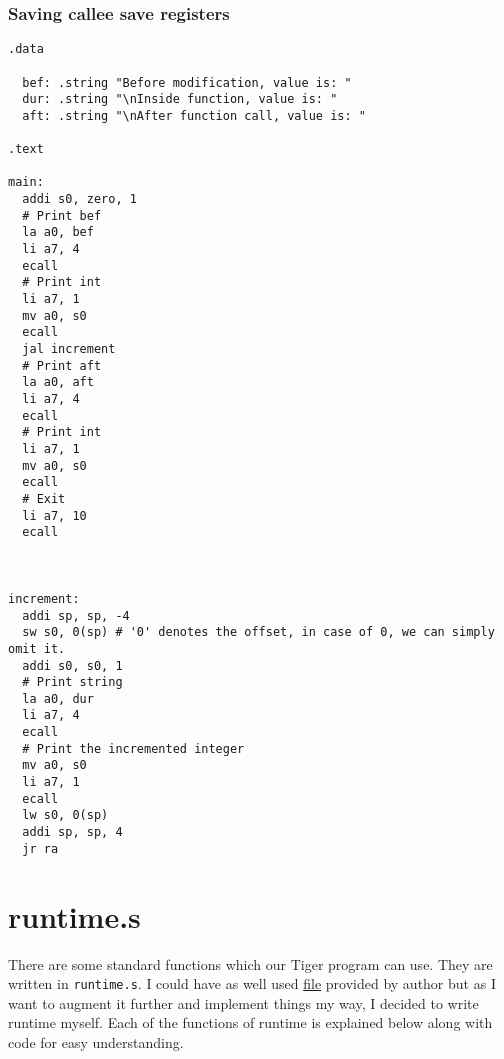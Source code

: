 \subsubsection{Saving callee save registers}
\begin{verbatim}
.data

  bef: .string "Before modification, value is: "
  dur: .string "\nInside function, value is: "
  aft: .string "\nAfter function call, value is: "

.text 

main:
  addi s0, zero, 1
  # Print bef
  la a0, bef
  li a7, 4
  ecall
  # Print int
  li a7, 1
  mv a0, s0
  ecall
  jal increment
  # Print aft
  la a0, aft
  li a7, 4
  ecall
  # Print int
  li a7, 1
  mv a0, s0
  ecall
  # Exit
  li a7, 10
  ecall



increment:
  addi sp, sp, -4
  sw s0, 0(sp) # '0' denotes the offset, in case of 0, we can simply omit it.
  addi s0, s0, 1
  # Print string
  la a0, dur
  li a7, 4
  ecall
  # Print the incremented integer
  mv a0, s0
  li a7, 1
  ecall
  lw s0, 0(sp)
  addi sp, sp, 4
  jr ra
\end{verbatim}

\section{runtime.s}

There are some standard functions which our Tiger program can use. They are written in \texttt{runtime.s}. I could have as well used \href{https://www.cs.princeton.edu/~appel/modern/spim/runtime.s}{file} provided by author but as I want to augment it further and implement things my way, I decided to write runtime myself. Each of the functions of runtime is explained below along with code for easy understanding. 

